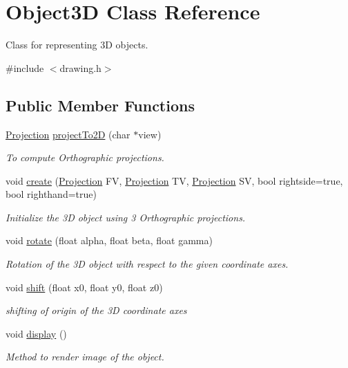 \hypertarget{class_object3_d}{}\section{Object3D Class Reference}
\label{class_object3_d}


Class for representing 3D objects.  




{\ttfamily \#include $<$drawing.\+h$>$}

\subsection*{Public Member Functions}
\begin{DoxyCompactItemize}
\item 
\mbox{\hyperlink{class_projection}{Projection}} \mbox{\hyperlink{class_object3_d_accfd3230b3f25661f2668f708ed53afe}{project\+To2D}} (char $\ast$view)
\begin{DoxyCompactList}\small\item\em To compute Orthographic projections. \end{DoxyCompactList}\item 
void \mbox{\hyperlink{class_object3_d_a05fabe70eda7b69715bd1bd2be7d057a}{create}} (\mbox{\hyperlink{class_projection}{Projection}} FV, \mbox{\hyperlink{class_projection}{Projection}} TV, \mbox{\hyperlink{class_projection}{Projection}} SV, bool rightside=true, bool righthand=true)
\begin{DoxyCompactList}\small\item\em Initialize the 3D object using 3 Orthographic projections. \end{DoxyCompactList}\item 
void \mbox{\hyperlink{class_object3_d_a41145f9464fe060f1d3b1b3c5cd82a2d}{rotate}} (float alpha, float beta, float gamma)
\begin{DoxyCompactList}\small\item\em Rotation of the 3D object with respect to the given coordinate axes. \end{DoxyCompactList}\item 
void \mbox{\hyperlink{class_object3_d_a9021a3005a02adbf6160694ec63fe273}{shift}} (float x0, float y0, float z0)
\begin{DoxyCompactList}\small\item\em shifting of origin of the 3D coordinate axes \end{DoxyCompactList}\item 
\mbox{\label{class_object3_d_a7fa9ab479c8b74fbf2ed03ba26afe863}} 
void \mbox{\hyperlink{class_object3_d_a7fa9ab479c8b74fbf2ed03ba26afe863}{display}} ()
\begin{DoxyCompactList}\small\item\em Method to render image of the object. \end{DoxyCompactList}\end{DoxyCompactItemize}
